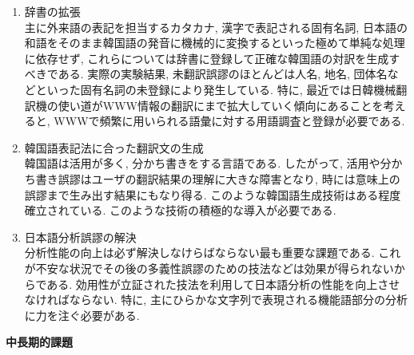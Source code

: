 \begin{enumerate}
\item 辞書の拡張 \\
 主に外来語の表記を担当するカタカナ, 漢字で表記される固有名詞, 日本語の和語をそのまま韓国語の発音に機械的に変換するといった極めて単純な処理に依存せず, これらについては辞書に登録して正確な韓国語の対訳を生成すべきである.  実際の実験結果, 未翻訳誤謬のほとんどは人名, 地名, 団体名などといった固有名詞の未登録により発生している. 特に, 最近では日韓機械翻訳機の使い道がWWW情報の翻訳にまで拡大していく傾向にあることを考えると, WWWで頻繁に用いられる語彙に対する用語調査と登録が必要である. 
\item 韓国語表記法に合った翻訳文の生成 \\
 韓国語は活用が多く, 分かち書きをする言語である. したがって, 活用や分かち書き誤謬はユーザの翻訳結果の理解に大きな障害となり, 時には意味上の誤謬まで生み出す結果にもなり得る. このような韓国語生成技術はある程度確立されている. このような技術の積極的な導入が必要である. 
\item 日本語分析誤謬の解決 \\
 分析性能の向上は必ず解決しなけらばならない最も重要な課題である. これが不安な状況でその後の多義性誤謬のための技法などは効果が得られないからである. 効用性が立証された技法を利用して日本語分析の性能を向上させなければならない. 特に, 主にひらかな文字列で表現される機能語部分の分析に力を注ぐ必要がある. 
\end{enumerate}

\begin{flushleft}
{\bf 中長期的課題}
\end{flushleft}


